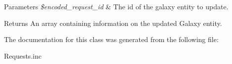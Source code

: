 \begin{DoxyParams}{Parameters}
{\em \$encoded\-\_\-request\-\_\-id} & The id of the galaxy entity to update.\\
\hline
\end{DoxyParams}
\begin{DoxyReturn}{Returns}
An array containing information on the updated Galaxy entity. 
\end{DoxyReturn}


The documentation for this class was generated from the following file\-:\begin{DoxyCompactItemize}
\item 
Requests.\-inc\end{DoxyCompactItemize}
